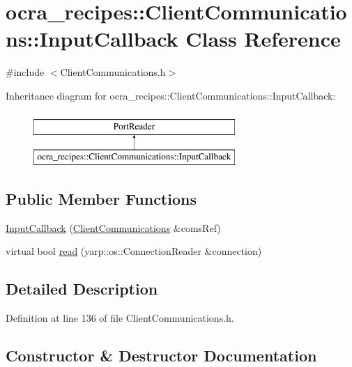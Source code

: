 \hypertarget{classocra__recipes_1_1ClientCommunications_1_1InputCallback}{}\section{ocra\+\_\+recipes\+:\+:Client\+Communications\+:\+:Input\+Callback Class Reference}
\label{classocra__recipes_1_1ClientCommunications_1_1InputCallback}


{\ttfamily \#include $<$Client\+Communications.\+h$>$}

Inheritance diagram for ocra\+\_\+recipes\+:\+:Client\+Communications\+:\+:Input\+Callback\+:\begin{figure}[H]
\begin{center}
\leavevmode
\includegraphics[height=2.000000cm]{de/dfc/classocra__recipes_1_1ClientCommunications_1_1InputCallback}
\end{center}
\end{figure}
\subsection*{Public Member Functions}
\begin{DoxyCompactItemize}
\item 
\hyperlink{classocra__recipes_1_1ClientCommunications_1_1InputCallback_aa5c33ecb3827af045af9b4206a0bfb31}{Input\+Callback} (\hyperlink{classocra__recipes_1_1ClientCommunications}{Client\+Communications} \&coms\+Ref)
\item 
virtual bool \hyperlink{classocra__recipes_1_1ClientCommunications_1_1InputCallback_ac35b3e10d832570b5559afd89d1a58c5}{read} (yarp\+::os\+::\+Connection\+Reader \&connection)
\end{DoxyCompactItemize}


\subsection{Detailed Description}


Definition at line 136 of file Client\+Communications.\+h.



\subsection{Constructor \& Destructor Documentation}
\hypertarget{classocra__recipes_1_1ClientCommunications_1_1InputCallback_aa5c33ecb3827af045af9b4206a0bfb31}{}\label{classocra__recipes_1_1ClientCommunications_1_1InputCallback_aa5c33ecb3827af045af9b4206a0bfb31} 
